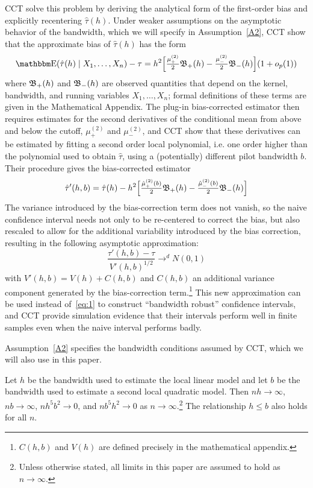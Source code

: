 \documentclass[12pt,fleqn]{article}
\begin{document}
CCT solve this problem by deriving the analytical form of the first-order bias
and explicitly recentering $\hat\tau(h)$. Under weaker assumptions on the
asymptotic behavior of the bandwidth, which we will specify in
Assumption~\ref{A2}, CCT show that the approximate bias of $\hat\tau(h)$ has the
form
\begin{equation*}
  \E(\hat{\tau}(h) \mid X_1,\dots,X_n) - \tau =
  h^{2}\Big[ \tfrac{\mu_{+}^{(2)}}{2}\Bf_{+}(h)
  - \tfrac{\mu_{-}^{(2)}}{2}\Bf_{-}(h) \Big]
  (1+o_{p}(1))
\end{equation*}
where $\mathfrak{B}_{+}(h)$ and $\mathfrak{B}_{-}(h)$ are observed quantities that depend on the
kernel, bandwidth, and running variables $X_1,\dots,X_n$; formal definitions of
these terms are given in the Mathematical Appendix. The plug-in bias-corrected
estimator then requires estimates
for the second derivatives of the conditional mean from above and below the
cutoff, $\mu_{+}^{(2)}$ and $\mu_{-}^{(2)}$, and CCT show that these derivatives
can be estimated by fitting a second order local polynomial, i.e. one order
higher than the polynomial used to obtain $\hat{\tau}$, using a (potentially)
different pilot bandwidth $b$. Their procedure gives the bias-corrected
estimator
\begin{gather*}
  \hat{\tau}'(h, b) = \hat{\tau}(h) - h^{2}
  \Big[\tfrac{\hat{\mu}_{+}^{(2)}(b)}{2} \mathfrak{B}_{+}(h)
  - \tfrac{\hat{\mu}_{-}^{(2)}(b)}{2}\mathfrak{B}_{-}(h) \Big]
\end{gather*}
The variance introduced by the bias-correction term does not vanish, so the
naive confidence interval needs not only to be re-centered to correct the bias,
but also rescaled to allow for the additional variability introduced by the bias
correction, resulting in the following asymptotic approximation:
\begin{equation*}
  \frac{\hat{\tau}'(h, b) - \tau}{V'(h, b)^{1/2}} \to^d N(0,1)
\end{equation*}
with $V'(h, b) = V(h) + C(h, b)$ and $C(h, b)$ an additional variance component
generated by the bias-correction term.\footnote{%
  $C(h,b)$ and $V(h)$ are defined precisely in the mathematical appendix.} %
This new approximation can be used
instead of~\eqref{eq:1} to construct ``bandwidth robust'' confidence intervals,
and CCT provide simulation evidence that their intervals perform well in finite
samples even when the naive interval performs badly.

Assumption~\ref{A2} specifies the bandwidth conditions assumed by CCT, which we
will also use in this paper.
\begin{assumption}[Bandwidth]\label{A2}
  Let $h$ be the bandwidth used to estimate the local linear model and let
  $b$ be the bandwidth used to estimate a second local quadratic model. Then
  $n h \to \infty$, $n b \to \infty$, $n h^{5} b^{2} \to 0$, and
  $n b^{5} h^{2} \to 0$ as $n \to \infty$.\footnote{%
    Unless otherwise stated, all limits in this paper are assumed to hold as
    $n \to \infty$.} %
  The relationship $h \leq b$ also holds for all $n$.
\end{assumption}
\end{document}
